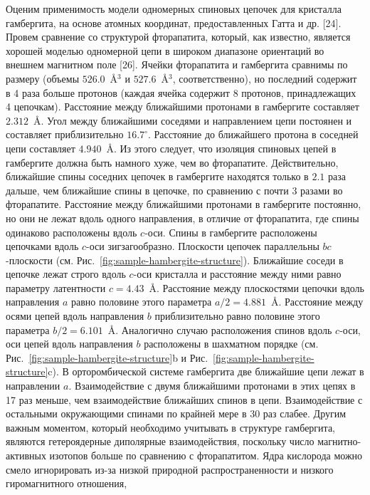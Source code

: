 Оценим применимость модели одномерных спиновых цепочек для кристалла гамбергита,
на основе атомных координат, предоставленных Гатта и др. [24].
Провем сравнение со структурой фторапатита,
который, как известно,
является хорошей моделью одномерной цепи в широком диапазоне ориентаций во внешнем магнитном поле [26].
Ячейки фторапатита и гамбергита сравнимы по размеру (объемы $526.0$~\r{A}$^3$ и $527.6$~\r{A}$^3$, соответственно),
но последний содержит в 4 раза больше протонов
(каждая ячейка содержит 8 протонов, принадлежащих 4 цепочкам).
Расстояние между ближайшими протонами в гамбергите составляет $2.312$~\r{A}.
Угол между ближайшими соседями и направлением цепи постоянен и составляет приблизительно $16.7^\circ$.
Расстояние до ближайшего протона в соседней цепи составляет $4.940$~\r{A}.
Из этого следует, что изоляция спиновых цепей в гамбергите должна быть намного хуже, чем во фторапатите.
Действительно, ближайшие спины соседних цепочек в гамбергите находятся только в $2.1$ раза дальше,
чем ближайшие спины в цепочке,
по сравнению с почти 3 разами во фторапатите.
Расстояние между ближайшими протонами в гамбергите постоянно,
но они не лежат вдоль одного направления,
в отличие от фторапатита,
где спины одинаково расположены вдоль $c$-оси.
Спины в гамбергите расположены цепочками вдоль $c$-оси зигзагообразно.
Плоскости цепочек параллельны $bc$-плоскости  (см. Рис.~\ref{fig:sample-hambergite-structure}).
Ближайшие соседи в цепочке лежат строго вдоль $c$-оси кристалла
и расстояние между ними равно параметру латентности $c = 4.43$~\r{A}.
Расстояние между плоскостями цепочки вдоль направления $a$ равно половине этого параметра $a/2 = 4.881$~\r{A}.
Расстояние между осями цепей вдоль направления $b$ приблизительно равно половине этого параметра $b/2 = 6.101$~\r{A}.
Аналогично случаю расположения спинов вдоль $c$-оси,
оси цепей вдоль направления $b$ расположены в шахматном порядке (см. Рис.~\ref{fig:sample-hambergite-structure}b и Рис.~\ref{fig:sample-hambergite-structure}c).
В орторомбической системе гамбергита две ближайшие цепи лежат в направлении $a$.
Взаимодействие с двумя ближайшими протонами в этих цепях в 17 раз меньше,
чем взаимодействие ближайших спинов в цепи.
Взаимодействие с остальными окружающими спинами по крайней мере в 30 раз слабее.
Другим важным моментом, который необходимо учитывать в структуре гамбергита,
являются гетероядерные диполярные взаимодействия,
поскольку число магнитно-активных изотопов больше по сравнению с фторапатитом.
Ядра кислорода можно смело игнорировать из-за низкой природной распространенности и низкого гиромагнитного отношения,
